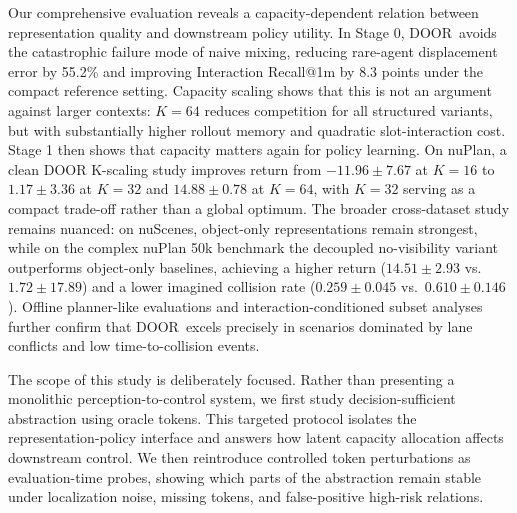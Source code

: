 \documentclass[10pt,journal,compsoc]{IEEEtran}
\newcommand{\method}{\textsc{DOOR}}
\begin{document}
Our comprehensive evaluation reveals a capacity-dependent relation between representation quality and downstream policy utility. In Stage 0, \method\ avoids the catastrophic failure mode of naive mixing, reducing rare-agent displacement error by 55.2\% and improving Interaction Recall@1m by 8.3 points under the compact reference setting. Capacity scaling shows that this is not an argument against larger contexts: $K=64$ reduces competition for all structured variants, but with substantially higher rollout memory and quadratic slot-interaction cost. Stage 1 then shows that capacity matters again for policy learning. On nuPlan, a clean DOOR K-scaling study improves return from $-11.96 \pm 7.67$ at $K=16$ to $1.17 \pm 3.36$ at $K=32$ and $14.88 \pm 0.78$ at $K=64$, with $K=32$ serving as a compact trade-off rather than a global optimum. The broader cross-dataset study remains nuanced: on nuScenes, object-only representations remain strongest, while on the complex nuPlan 50k benchmark the decoupled no-visibility variant outperforms object-only baselines, achieving a higher return ($14.51 \pm 2.93$ vs.\ $1.72 \pm 17.89$) and a lower imagined collision rate ($0.259 \pm 0.045$ vs.\ $0.610 \pm 0.146$). Offline planner-like evaluations and interaction-conditioned subset analyses further confirm that \method\ excels precisely in scenarios dominated by lane conflicts and low time-to-collision events.

The scope of this study is deliberately focused. Rather than presenting a monolithic perception-to-control system, we first study decision-sufficient abstraction using oracle tokens. This targeted protocol isolates the representation-policy interface and answers how latent capacity allocation affects downstream control. We then reintroduce controlled token perturbations as evaluation-time probes, showing which parts of the abstraction remain stable under localization noise, missing tokens, and false-positive high-risk relations.

\end{document}
